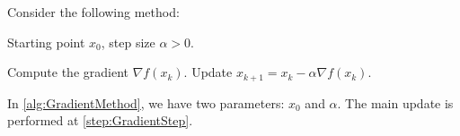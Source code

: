 \documentclass{article}
\begin{document}
  Consider the following method:

  \begin{SimpleAlgorithm}
  [
    title={Gradient Method},
    label=alg:GradientMethod,
    width=0.55\linewidth
  ]
    \begin{AlgorithmGroup}[Input]
      Starting point $x_0$, step size $\alpha > 0$.
    \end{AlgorithmGroup}
    \AlgorithmGroupSeparator
    \begin{AlgorithmGroup}
      \begin{AlgorithmSteps}
        \AlgorithmStep Compute the gradient $\nabla f(x_k)$.
        \AlgorithmStep\label{step:GradientStep} Update $x_{k+1} = x_k - \alpha \nabla f(x_k)$.
      \end{AlgorithmSteps}
    \end{AlgorithmGroup}
  \end{SimpleAlgorithm}
  
  In \cref{alg:GradientMethod}, we have two parameters: $x_0$ and $\alpha$. The main update is performed at
  \cref{step:GradientStep}.
\end{document}
